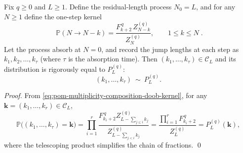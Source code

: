 \begin{algorithm}\label{alg:pom-multiplicity-composition-doob-update-sampler}
Fix \(q\ge 0\) and \(L\ge 1\). Define the residual-length process \(N_0=L\), and for any \(N\ge 1\) define the one-step kernel
\begin{equation}\label{eq:pom-multiplicity-composition-doob-kernel}
\boxed{\;
\mathbb{P}(N\to N-k)=\frac{F_{k+2}^{\,q}\,Z_{N-k}^{(q)}}{Z_N^{(q)}},
\qquad 1\le k\le N\; }.
\end{equation}
Let the process absorb at \(N=0\), and record the jump lengths at each step as \(k_1,k_2,\dots,k_{\tau}\) (where \(\tau\) is the absorption time).
Then \((k_1,\dots,k_\tau)\in\mathcal{C}_L\) and its distribution is rigorously equal to \(P_L^{(q)}\):
\[
(k_1,\dots,k_\tau)\ \sim\ P_L^{(q)}.
\]
\end{algorithm}
\begin{proof}
From \eqref{eq:pom-multiplicity-composition-doob-kernel},
for any \(\boldsymbol{k}=(k_1,\dots,k_r)\in\mathcal{C}_L\),
\[
\mathbb{P}\bigl((k_1,\dots,k_\tau)=\boldsymbol{k}\bigr)
=\prod_{i=1}^{r}\frac{F_{k_i+2}^{\,q}Z_{L-\sum_{j\le i}k_j}^{(q)}}{Z_{L-\sum_{j<i}k_j}^{(q)}}
=\frac{\prod_{i=1}^{r}F_{k_i+2}^{\,q}}{Z_L^{(q)}}
=P_L^{(q)}(\boldsymbol{k}),
\]
where the telescoping product simplifies the chain of fractions. \qed
\end{proof}


